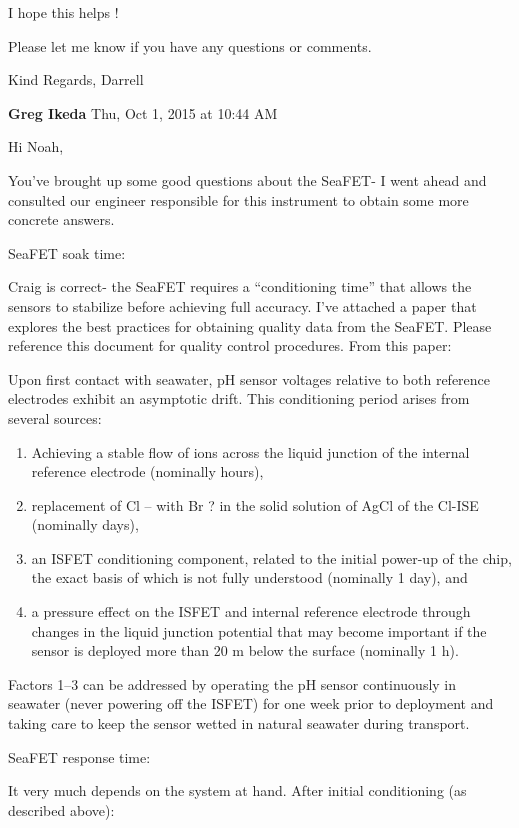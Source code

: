 \documentclass[]{book}
\begin{document}
I hope this helps !

Please let me know if you have any questions or comments.

Kind Regards, Darrell

\textbf{Greg Ikeda} Thu, Oct 1, 2015 at 10:44 AM

Hi Noah,

You've brought up some good questions about the SeaFET- I went ahead and
consulted our engineer responsible for this instrument to obtain some
more concrete answers.

SeaFET soak time:

Craig is correct- the SeaFET requires a ``conditioning time'' that
allows the sensors to stabilize before achieving full accuracy. I've
attached a paper that explores the best practices for obtaining quality
data from the SeaFET. Please reference this document for quality control
procedures. From this paper:

Upon first contact with seawater, pH sensor voltages relative to both
reference electrodes exhibit an asymptotic drift. This conditioning
period arises from several sources:

\begin{enumerate}
\def\labelenumi{\arabic{enumi})}
\item
  Achieving a stable flow of ions across the liquid junction of the
  internal reference electrode (nominally hours),
\item
  replacement of Cl -- with Br ? in the solid solution of AgCl of the
  Cl-ISE (nominally days),
\item
  an ISFET conditioning component, related to the initial power-up of
  the chip, the exact basis of which is not fully understood (nominally
  1 day), and
\item
  a pressure effect on the ISFET and internal reference electrode
  through changes in the liquid junction potential that may become
  important if the sensor is deployed more than 20 m below the surface
  (nominally 1 h).
\end{enumerate}

Factors 1--3 can be addressed by operating the pH sensor continuously in
seawater (never powering off the ISFET) for one week prior to deployment
and taking care to keep the sensor wetted in natural seawater during
transport.

SeaFET response time:

It very much depends on the system at hand. After initial conditioning
(as described above):
\end{document}
